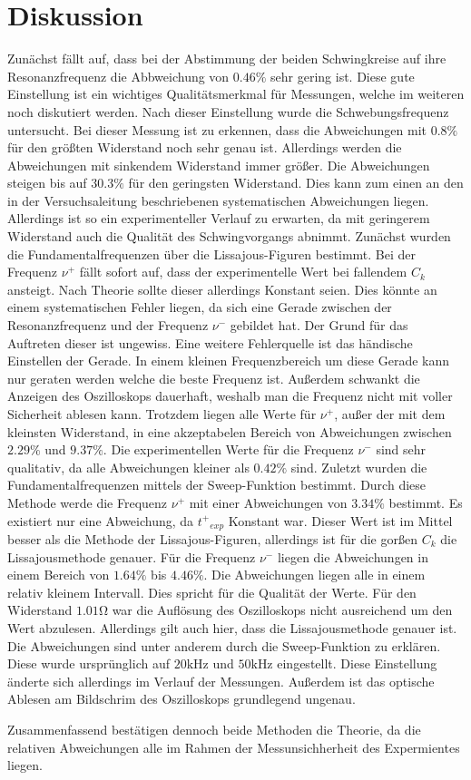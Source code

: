 \section{Diskussion}
\label{sec:Diskussion}
Zunächst fällt auf, dass bei der Abstimmung der beiden Schwingkreise auf ihre Resonanzfrequenz die Abbweichung von $0.46\%$ sehr gering ist. Diese gute Einstellung ist ein wichtiges Qualitätsmerkmal
für Messungen, welche im weiteren noch diskutiert werden. Nach dieser Einstellung wurde die Schwebungsfrequenz untersucht. Bei dieser Messung ist zu erkennen, dass die Abweichungen mit $0.8\%$ für
den größten Widerstand noch sehr genau ist. Allerdings werden die Abweichungen mit sinkendem Widerstand immer größer. Die Abweichungen steigen bis auf $30.3\%$ für den geringsten Widerstand. Dies 
kann zum einen an den in der Versuchsaleitung \cite{v355} beschriebenen systematischen Abweichungen liegen. Allerdings ist so ein experimenteller Verlauf zu erwarten, da mit geringerem Widerstand 
auch die Qualität des Schwingvorgangs abnimmt. Zunächst wurden die Fundamentalfrequenzen über die Lissajous-Figuren bestimmt. Bei der Frequenz $\nu^+$ fällt sofort auf, dass der experimentelle Wert
bei fallendem $C_k$ ansteigt. Nach Theorie sollte dieser allerdings Konstant seien. Dies könnte an einem systematischen Fehler liegen, da sich eine Gerade zwischen der Resonanzfrequenz und der Frequenz
$\nu^-$ gebildet hat. Der Grund für das Auftreten dieser ist ungewiss. Eine weitere Fehlerquelle ist das händische Einstellen der Gerade. In einem kleinen Frequenzbereich um diese Gerade kann nur geraten werden 
welche die beste Frequenz ist. Außerdem schwankt die Anzeigen des Oszilloskops dauerhaft, weshalb man die Frequenz nicht mit voller Sicherheit ablesen kann. Trotzdem liegen alle Werte
für $\nu^+$, außer der mit dem kleinsten Widerstand, in eine akzeptabelen Bereich von Abweichungen zwischen $2.29\%$ und $9.37\%$. Die experimentellen Werte für die Frequenz $\nu^-$ sind sehr 
qualitativ, da alle Abweichungen kleiner als $0.42\%$ sind. Zuletzt wurden die Fundamentalfrequenzen mittels der Sweep-Funktion bestimmt. Durch diese Methode werde die Frequenz $\nu^+$ mit einer 
Abweichungen von $3.34\%$ bestimmt. Es existiert nur eine Abweichung, da ${t^+}_{exp}$ Konstant war. Dieser Wert ist im Mittel besser als die Methode der Lissajous-Figuren, allerdings ist für die gorßen 
$C_k$ die Lissajousmethode genauer. Für die Frequenz $\nu^-$ liegen die Abweichungen in einem Bereich von $1.64\%$ bis $4.46\%$. Die Abweichungen liegen alle in einem relativ kleinem Intervall. 
Dies spricht für die Qualität der Werte. Für den Widerstand $1.01\unit{\ohm}$ war die Auflösung des Oszilloskops nicht ausreichend um den Wert abzulesen. Allerdings gilt auch hier, dass die Lissajousmethode 
genauer ist. Die Abweichungen sind unter anderem durch die Sweep-Funktion zu erklären. Diese wurde ursprünglich auf $20 \unit{\kilo\hertz}$ und $50 \unit{\kilo\hertz}$ eingestellt. 
Diese Einstellung änderte sich allerdings im Verlauf der Messungen. Außerdem ist das optische Ablesen am Bildschrim des Oszilloskops grundlegend ungenau.


Zusammenfassend bestätigen dennoch beide Methoden die Theorie, da die relativen Abweichungen alle im Rahmen der Messunsichherheit des Expermientes liegen. 